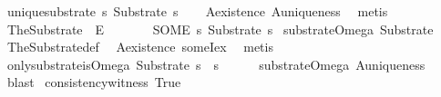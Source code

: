 \begin{isabellebody}
\isanewline
{}\isamarkupfalse%
\ unique{\isacharunderscore}{\kern0pt}substrate{\isacharcolon}{\kern0pt}\ {\isachardoublequoteopen}{\isasymexists}{\isacharbang}{\kern0pt}s{\isachardot}{\kern0pt}\ Substrate\ s{\isachardoublequoteclose}\isanewline
%
\isadelimproof
\ \ %
\endisadelimproof
%
\isatagproof
{}\isamarkupfalse%
\ A{}{\isacharunderscore}{\kern0pt}existence\ A{}{\isacharunderscore}{\kern0pt}uniqueness\ \isamarkupfalse%
\ {\isacharparenleft}{\kern0pt}metis{\isacharparenright}{\kern0pt}%
\endisatagproof
{\isafoldproof}%
%
\isadelimproof
\isanewline
%
\endisadelimproof
\isanewline
{}\isamarkupfalse%
\ TheSubstrate\ {\isacharcolon}{\kern0pt}{\isacharcolon}{\kern0pt}\ {\isachardoublequoteopen}E{\isachardoublequoteclose}\ \ {\isacharparenleft}{\kern0pt}{\isachardoublequoteopen}{\isasymOmega}{\isachardoublequoteclose}{\isacharparenright}{\kern0pt}\isanewline
\ \ \ {\isachardoublequoteopen}{\isasymOmega}\ {\isacharequal}{\kern0pt}\ {\isacharparenleft}{\kern0pt}SOME\ s{\isachardot}{\kern0pt}\ Substrate\ s{\isacharparenright}{\kern0pt}{\isachardoublequoteclose}\isanewline
\isanewline
{}\isamarkupfalse%
\ substrate{\isacharunderscore}{\kern0pt}Omega{\isacharcolon}{\kern0pt}\ {\isachardoublequoteopen}Substrate\ {\isasymOmega}{\isachardoublequoteclose}\isanewline
%
\isadelimproof
\ \ %
\endisadelimproof
%
\isatagproof
{}\isamarkupfalse%
\ TheSubstrate{\isacharunderscore}{\kern0pt}def\ \isamarkupfalse%
\ A{}{\isacharunderscore}{\kern0pt}existence\ someI{\isacharunderscore}{\kern0pt}ex\ \isamarkupfalse%
\ metis%
\endisatagproof
{\isafoldproof}%
%
\isadelimproof
\isanewline
%
\endisadelimproof
\isanewline
{}\isamarkupfalse%
\ only{\isacharunderscore}{\kern0pt}substrate{\isacharunderscore}{\kern0pt}is{\isacharunderscore}{\kern0pt}Omega{\isacharcolon}{\kern0pt}\ {\isachardoublequoteopen}Substrate\ s\ {\isasymLongrightarrow}\ s\ {\isacharequal}{\kern0pt}\ {\isasymOmega}{\isachardoublequoteclose}\isanewline
%
\isadelimproof
\ \ %
\endisadelimproof
%
\isatagproof
{}\isamarkupfalse%
\ substrate{\isacharunderscore}{\kern0pt}Omega\ A{}{\isacharunderscore}{\kern0pt}uniqueness\ \isamarkupfalse%
\ blast%
\endisatagproof
{\isafoldproof}%
%
\isadelimproof
\isanewline
%
\endisadelimproof
\isanewline
{}\isamarkupfalse%
\ consistency{\isacharunderscore}{\kern0pt}witness{\isacharcolon}{\kern0pt}\ True%

\end{isabellebody}
